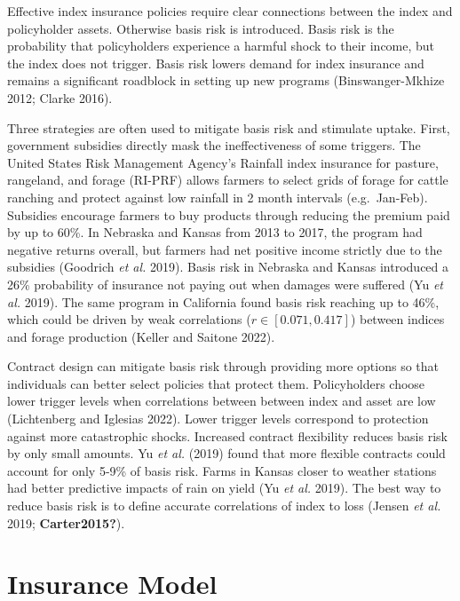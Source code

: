 \documentclass[
  letterpaper,
  DIV=11,
  numbers=noendperiod]{scrartcl}
\begin{document}
Effective index insurance policies require clear connections between the
index and policyholder assets. Otherwise basis risk is introduced. Basis
risk is the probability that policyholders experience a harmful shock to
their income, but the index does not trigger. Basis risk lowers demand
for index insurance and remains a significant roadblock in setting up
new programs (Binswanger-Mkhize 2012; Clarke 2016).

Three strategies are often used to mitigate basis risk and stimulate
uptake. First, government subsidies directly mask the ineffectiveness of
some triggers. The United States Risk Management Agency's Rainfall index
insurance for pasture, rangeland, and forage (RI-PRF) allows farmers to
select grids of forage for cattle ranching and protect against low
rainfall in 2 month intervals (e.g.~Jan-Feb). Subsidies encourage
farmers to buy products through reducing the premium paid by up to 60\%.
In Nebraska and Kansas from 2013 to 2017, the program had negative
returns overall, but farmers had net positive income strictly due to the
subsidies (Goodrich \emph{et al.} 2019). Basis risk in Nebraska and
Kansas introduced a 26\% probability of insurance not paying out when
damages were suffered (Yu \emph{et al.} 2019). The same program in
California found basis risk reaching up to 46\%, which could be driven
by weak correlations (\(r \in[0.071,0.417]\)) between indices and forage
production (Keller and Saitone 2022).

Contract design can mitigate basis risk through providing more options
so that individuals can better select policies that protect them.
Policyholders choose lower trigger levels when correlations between
between index and asset are low (Lichtenberg and Iglesias 2022). Lower
trigger levels correspond to protection against more catastrophic
shocks. Increased contract flexibility reduces basis risk by only small
amounts. Yu \emph{et al.} (2019) found that more flexible contracts
could account for only 5-9\% of basis risk. Farms in Kansas closer to
weather stations had better predictive impacts of rain on yield (Yu
\emph{et al.} 2019). The best way to reduce basis risk is to define
accurate correlations of index to loss (Jensen \emph{et al.} 2019;
\textbf{Carter2015?}).

\hypertarget{insurance-model}{%
\section{Insurance Model}\label{insurance-model}}
\end{document}
